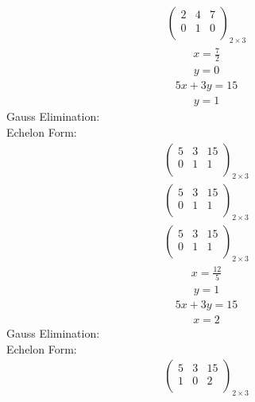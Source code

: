 \documentclass{article}
\begin{document}
\begin{align*}
\left(
\begin{array}{cc|c}
2 & 4 & 7\\
0 & 1 & 0\\
\end{array}
\right)_{2\times 3}
\end{align*}
\begin{align*}
x=\frac{7}{2}\end{align*}
\begin{align*}
y=0\end{align*}
\begin{align*}
5x + 3y=15\end{align*}
\begin{align*}
y=1\end{align*}
Gauss Elimination:\\
Echelon Form:\\
\begin{align*}
\left(
\begin{array}{cc|c}
5 & 3 & 15\\
0 & 1 & 1\\
\end{array}
\right)_{2\times 3}
\end{align*}
\begin{align*}
\left(
\begin{array}{cc|c}
5 & 3 & 15\\
0 & 1 & 1\\
\end{array}
\right)_{2\times 3}
\end{align*}
\begin{align*}
\left(
\begin{array}{cc|c}
5 & 3 & 15\\
0 & 1 & 1\\
\end{array}
\right)_{2\times 3}
\end{align*}
\begin{align*}
x=\frac{12}{5}\end{align*}
\begin{align*}
y=1\end{align*}
\begin{align*}
5x + 3y=15\end{align*}
\begin{align*}
x=2\end{align*}
Gauss Elimination:\\
Echelon Form:\\
\begin{align*}
\left(
\begin{array}{cc|c}
5 & 3 & 15\\
1 & 0 & 2\\
\end{array}
\right)_{2\times 3}
\end{align*}
\end{document}
